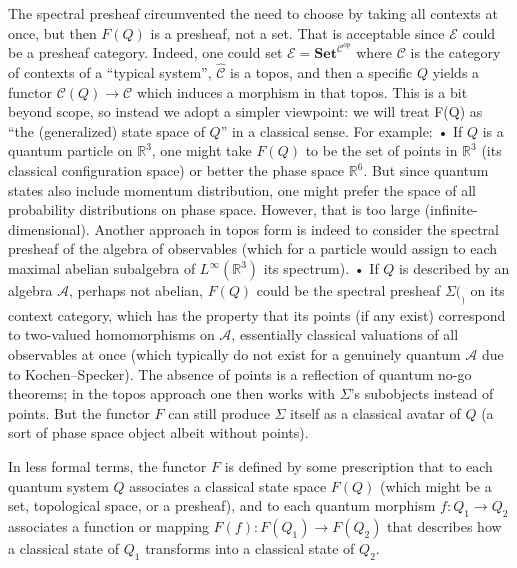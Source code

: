 The spectral presheaf circumvented the need to choose by taking all contexts at once, but then $F(Q)$ is a presheaf, not a set. That is acceptable since $\mathcal{E}$ could be a presheaf category. Indeed, one could set $\mathcal{E} = \mathbf{Set}^{\mathcal{C}^{op}}$ where $\mathcal{C}$ is the category of contexts of a “typical system”, $\widehat{\mathcal{C}}$ is a topos, and then a specific $Q$ yields a functor $\mathcal{C}(Q) \to \mathcal{C}$ which induces a morphism in that topos. This is a bit beyond scope, so instead we adopt a simpler viewpoint:
we will treat
F(Q)
as “the (generalized) state space of $Q$” in a classical sense. For example:
	•	If $Q$ is a quantum particle on $\mathbb{R}^3$, one might take $F(Q)$ to be the set of points in $\mathbb{R}^3$ (its classical configuration space) or better the phase space $\mathbb{R}^6$. But since quantum states also include momentum distribution, one might prefer the space of all probability distributions on phase space. However, that is too large (infinite-dimensional). Another approach in topos form is indeed to consider the spectral presheaf of the algebra of observables (which for a particle would assign to each maximal abelian subalgebra of $L^\infty(\mathbb{R}^3)$ its spectrum).
	•	If $Q$ is described by an algebra $\mathcal{A}$, perhaps not abelian, $F(Q)$ could be the spectral presheaf $\Sigma(_)$ on its context category, which has the property that its points (if any exist) correspond to two-valued homomorphisms on $\mathcal{A}$, essentially classical valuations of all observables at once (which typically do not exist for a genuinely quantum $\mathcal{A}$ due to Kochen–Specker). The absence of points is a reflection of quantum no-go theorems; in the topos approach one then works with $\Sigma$’s subobjects instead of points. But the functor $F$ can still produce $\Sigma$ itself as a classical avatar of $Q$ (a sort of phase space object albeit without points).

In less formal terms, the functor $F$ is defined by some prescription that to each quantum system $Q$ associates a classical state space $F(Q)$ (which might be a set, topological space, or a presheaf), and to each quantum morphism $f: Q_1 \to Q_2$ associates a function or mapping $F(f): F(Q_1) \to F(Q_2)$ that describes how a classical state of $Q_1$ transforms into a classical state of $Q_2$.

